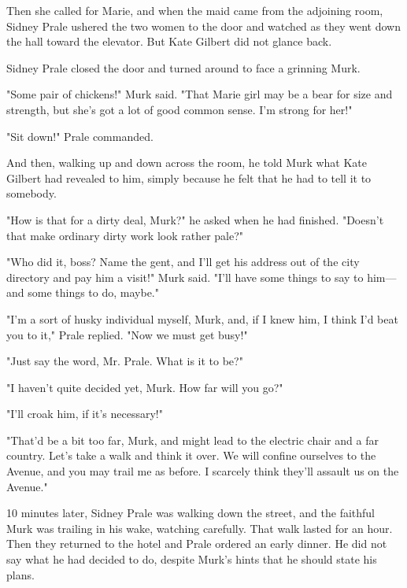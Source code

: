 \documentclass{novel}
\begin{document}
Then she called for Marie, and when the maid came from the adjoining room, Sidney Prale ushered the two women to the door and watched as they went down the hall toward the elevator. But Kate Gilbert did not glance back.

\vspace{2\nbs}
\clearpage
\thispagestyle{empty}

\begin{ChapterStart}
\vspace{3\nbs}
\end{ChapterStart}
    
Sidney Prale closed the door and turned around to face a grinning Murk.

"Some pair of chickens!" Murk said. "That Marie girl may be a bear for size and strength, but she's got a lot of good common sense. I'm strong for her!"

"Sit down!" Prale commanded.

And then, walking up and down across the room, he told Murk what Kate Gilbert had revealed to him, simply because he felt that he had to tell it to somebody.

"How is that for a dirty deal, Murk?" he asked when he had finished. "Doesn't that make ordinary dirty work look rather pale?"

"Who did it, boss? Name the gent, and I'll get his address out of the city directory and pay him a visit!" Murk said. "I'll have some things to say to him---and some things to do, maybe."

"I'm a sort of husky individual myself, Murk, and, if I knew him, I think I'd beat you to it," Prale replied. "Now we must get busy!"

"Just say the word, Mr. Prale. What is it to be?"

"I haven't quite decided yet, Murk. How far will you go?"

"I'll croak him, if it's necessary!"

"That'd be a bit too far, Murk, and might lead to the electric chair and a far country. Let's take a walk and think it over. We will confine ourselves to the Avenue, and you may trail me as before. I scarcely think they'll assault us on the Avenue."

10 minutes later, Sidney Prale was walking down the street, and the faithful Murk was trailing in his wake, watching carefully. That walk lasted for an hour. Then they returned to the hotel and Prale ordered an early dinner. He did not say what he had decided to do, despite Murk's hints that he should state his plans.
\end{document}
